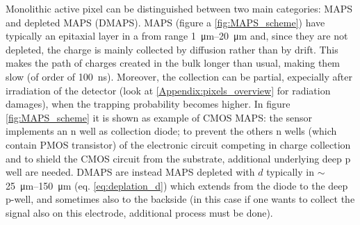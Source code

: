    Monolithic active pixel can be distinguished between two main categories: MAPS and depleted MAPS (DMAPS).
   MAPS (figure a \ref{fig:MAPS_scheme}) have typically an epitaxial layer in a from range \SIrange{1}{20}{\um} and, since they are not depleted, the charge is mainly collected by diffusion rather than by drift. This makes the path of charges created in the bulk longer than usual, making them slow (of order of \SI{100}{ns}). Moreover, the collection can be partial, expecially after irradiation of the detector (look at \ref{Appendix:pixels_overview} for radiation damages), when the trapping probability becomes higher. 
   In figure \ref{fig:MAPS_scheme} it is shown as example of CMOS MAPS: the sensor implements an n well as collection diode; to prevent the others n wells (which contain PMOS transistor) of the electronic circuit competing in charge collection and to shield the CMOS circuit from the substrate, additional underlying deep p well are needed.
   DMAPS are instead MAPS depleted with $d$ typically in $\sim$\SIrange{25}{150}{\um} (eq. \ref{eq:deplation_d}) which extends from the diode to the deep p-well, and sometimes also to the backside (in this case if one wants to collect the signal also on this electrode, additional process must be done).

